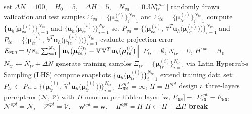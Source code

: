\documentclass[12pt, a4paper, twoside, openright]{report}
\makeatletter
\numberwithin{equation}{chapter}
\DeclarePairedDelimiter\abs{\lvert}{\rvert}
\let\oldabs\abs
\def\abs{\@ifstar{\oldabs}{\oldabs*}}
\theoremstyle{theorem}
\theoremstyle{definition}
\theoremstyle{remark}
\theoremstyle{proposition}
\numberwithin{figure}{chapter}
\newcommand{\norm}[1]{\left\lVert#1\right\rVert}
\newcommand{\bg}[1]{\boldsymbol{#1}}
\makeatother
\begin{document}
		\begin{algorithm}[t]	
			\begin{algorithmic}[1]
					\vspace*{0.2cm}
					\State set $\Delta N = 100$, ~ $H_0 = 5$, ~ $\Delta H = 5$, ~ $N_{va} = \lceil 0.3 N_{tr}^{max} \rceil$ 
					\State randomly drawn validation and test samples $\Xi_{va} = \big\lbrace \bg{\mu}_{va}^{(i)} \big\rbrace_{i = 1}^{N_{va}}$ and $\Xi_{te} = \big\lbrace \bg{\mu}_{te}^{(i)} \big\rbrace_{i = 1}^{N_{te}}$
					\State compute $\big\lbrace \mathbf{u}_h \big( \bg{\mu}_{va}^{(i)} \big) \big\rbrace_{i = 1}^{N_{va}}$ and $\big\lbrace \mathbf{u}_h \big( \bg{\mu}_{te}^{(i)} \big) \big\rbrace_{i = 1}^{N_{te}}$
					\State set $P_{va} = \big\lbrace \big( \bg{\mu}_{va}^{(i)}, \, \mathbb{V}^T \mathbf{u}_h \big( \bg{\mu}_{va}^{(i)} \big) \big) \big\rbrace_{i = 1}^{N_{va}}$ and $P_{te} = \big\lbrace \big( \bg{\mu}_{te}^{(i)}, \, \mathbb{V}^T \mathbf{u}_h \big( \bg{\mu}_{te}^{(i)} \big) \big) \big\rbrace_{i = 1}^{N_{te}}$
					\State evaluate projection error $E_{\texttt{POD}} = \nicefrac{1}{N_{te}} \sum_{i = 1}^{N_{te}} \norm{\mathbf{u}_h \big( \bg{\mu}_{te}^{(i)} \big) - \mathbb{V} \, \mathbb{V}^T \mathbf{u}_h \big( \bg{\mu}_{te}^{(i)} \big)}$
					\State $P_{tr} = \emptyset$, $N_{tr} = 0$, $H^{opt} = H_0$
					\DoWhile
						\State $N_{tr} \leftarrow N_{tr} + \Delta N$
						\State generate training samples $\Xi_{tr} = \big\lbrace \bg{\mu}_{tr}^{(i)} \big\rbrace_{i = 1}^{N_{tr}}$ via Latin Hypercube Sampling (LHS)
						\State compute snapshots $\big\lbrace \mathbf{u}_h \big( \bg{\mu}_{tr}^{(i)} \big) \big\rbrace_{i = 1}^{N_{tr}}$
						\State extend training data set: $P_{tr} \leftarrow P_{tr} \cup \big\lbrace \big( \bg{\mu}_{tr}^{(i)}, \, \mathbb{V}^T \mathbf{u}_h \big( \bg{\mu}_{tr}^{(i)} \big) \big) \big\rbrace_{i = 1}^{N_{tr}}$
						\State $E_{\texttt{NN}}^{opt} = \infty$, $H = H^{opt}$
							\State design a three-layers perceptron $\big( \mathcal{N}, \, \mathcal{V} \big)$ with $H$ neurons per hidden layer
							\State $\big[ \mathbf{w}, \, E_{\texttt{NN}} \big] = $ 
								\State $E_{\texttt{NN}}^{opt} = E_{\texttt{NN}}$, ~ $\mathcal{N}^{opt} = \mathcal{N}$, ~ $\mathcal{V}^{opt} = \mathcal{V}$, ~ $\mathbf{w}^{opt} = \mathbf{w}$, ~ $H^{opt} = H$
								\State $H \leftarrow H + \Delta H$
							\Else {}
								\State \textbf{break}
							\EndIf
						\EndWhile
					\EndDoWhile{$N_{tr} \leq N_{tr}^{max}$ and $\abs{E_{\texttt{POD}} - E_{\texttt{NN}}^{opt}} > \varepsilon$}
				\EndFunction
				

\end{algorithmic}
\end{algorithm}
\end{document}
